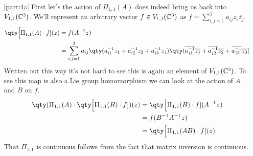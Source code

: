 \documentclass[
	pages,
	boxes,
	color=WildStrawberry
]{homework}
\theoremstyle{plain}
\begin{document}
\begin{solution}
	\ref{part:4a}
	First let's the action of $\Pi_{1,1}(A)$ does indeed bring us back into $V_{1,1}(\mathbb{C}^3)$. We'll represent an arbitrary vector $f\in V_{1,1}(\mathbb{C}^3)$ as $f = \sum_{i,j=1}^3 a_{ij}z_i\overline{z_j}$.
	\begin{align*}
		\qty\Big[\Pi_{1,1}(A)\cdot f](z) & = f(A^{-1}z)                                                                                                                                                                                          \\
		                                 & = \sum_{i,j=1}^3 a_{ij}\qty(a_{i1}^{-1}z_1 + a_{i2}^{-1}z_2 + a_{i3}^{-1}z_1)\qty(\overline{a_{j1}^{-1}}\overline{z_j} + \overline{a_{j2}^{-1}}\overline{z_2} + \overline{a_{j3}^{-1}}\overline{z_3})
	\end{align*}
	Written out this way it's not hard to see this is again an element of $V_{1,1}(\mathbb{C}^3)$. To see this map is also a Lie group homomorphism we can look at the action of $A$ and $B$ on $f$.
	\begin{align*}
		\qty(\Pi_{1,1}(A)\cdot\qty\Big[\Pi_{1,1}(B)\cdot f])(z) & = \qty\Big[\Pi_{1,1}(B)\cdot f](A^{-1}z) \\
		                                                        & = f(B^{-1}A^{-1}z)                       \\
		                                                        & = \qty\Big[\Pi_{1,1}(AB)\cdot f](z)
	\end{align*}
	That $\Pi_{1,1}$ is continuous follows from the fact that matrix inversion is continuous.


\end{solution}
\end{document}
